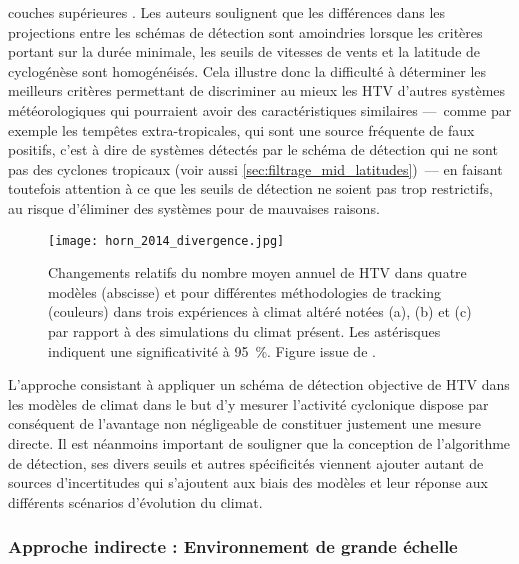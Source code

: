 \documentclass[../main.tex]{subfiles}
\begin{document}
couches supérieures \parencite{horn_tracking_2014}. Les auteurs soulignent que les différences dans les projections entre les schémas de détection sont
amoindries lorsque les critères portant sur la durée minimale, les seuils de vitesses de vents et la latitude de cyclogénèse sont homogénéisés. Cela illustre
donc la difficulté à déterminer les meilleurs critères permettant de discriminer au mieux les HTV d'autres systèmes météorologiques qui pourraient avoir des
caractéristiques similaires ---~comme par exemple les tempêtes extra-tropicales, qui sont une source fréquente de faux positifs, c'est à dire de systèmes
détectés par le schéma de détection qui ne sont pas des cyclones tropicaux (voir aussi \cref{sec:filtrage_mid_latitudes})~--- en faisant toutefois attention à
ce que les seuils de détection ne soient pas trop restrictifs, au risque d'éliminer des systèmes pour de mauvaises raisons.

\begin{figure}[tb]
    \centering
    \texttt{[image: horn\_2014\_divergence.jpg]}
    \caption{Changements relatifs du nombre moyen annuel de HTV dans quatre modèles (abscisse) et pour différentes méthodologies de tracking (couleurs) dans
    trois expériences à climat altéré notées (a), (b) et (c) par rapport à des simulations du climat présent. Les astérisques indiquent une significativité à
    \SI{95}{\percent}. Figure issue de \cite{horn_tracking_2014}.}
    \label{fig:horn_2014_projections}
\end{figure}

L'approche consistant à appliquer un schéma de détection objective de HTV dans les modèles de climat dans le but d'y mesurer l'activité cyclonique dispose par
conséquent de l'avantage non négligeable de constituer justement une mesure directe. Il est néanmoins important de souligner que la conception de l'algorithme
de détection, ses divers seuils et autres spécificités viennent ajouter autant de sources d'incertitudes qui s'ajoutent aux biais des modèles et leur réponse
aux différents scénarios d'évolution du climat.

\subsubsection{Approche indirecte : Environnement de grande échelle}\label{sec:intro_indices}
\end{document}
